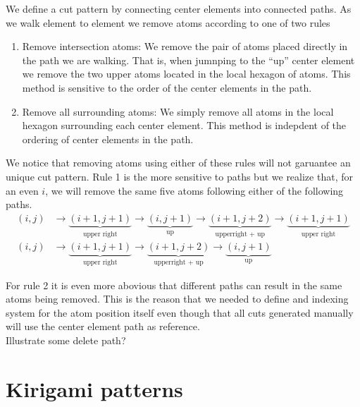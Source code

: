 We define a cut pattern by connecting center elements into connected paths. As
we walk element to element we remove atoms according to one of two rules 
\begin{enumerate}
  \item Remove intersection atoms: We remove the pair of atoms placed directly
  in the path we are walking. That is, when jumnping to the ``up'' center
  element we remove the two upper atoms located in the local hexagon of atoms.
  This method is sensitive to the order of the center elements in the path. 
  \item Remove all surrounding atoms: We simply remove all atoms in the local
  hexagon surrounding each center element. This method is indepdent of the
  ordering of center elements in the path.
\end{enumerate}

We notice that removing atoms using either of these rules will not garuantee an
unique cut pattern. Rule 1 is the more sensitive to paths but we realize that,
for an even $i$, we will remove the same five atoms following either of the
following paths.
\begin{align*}
  (i, j) &\rightarrow \underbrace{(i+1,j+1)}_{\text{upper right}} \rightarrow \underbrace{(i, j+1)}_{\text{up}} \rightarrow \underbrace{(i+1, j+2)}_{\text{upperright + up}} \rightarrow \underbrace{(i+1, j+1)}_{\text{upper right}} \\
  (i, j) &\rightarrow \underbrace{(i+1,j+1)}_{\text{upper right}} \rightarrow \underbrace{(i+1, j+2)}_{\text{upperright + up}} \rightarrow \underbrace{(i, j+1)}_{\text{up}}
\end{align*}

For rule 2 it is even more abovious that different paths can result in the same
atoms being removed. This is the reason that we needed to define and indexing
system for the atom position itself even though that all cuts generated manually
will use the center element path as reference. \\

Illustrate some delete path?



\section{Kirigami patterns}

